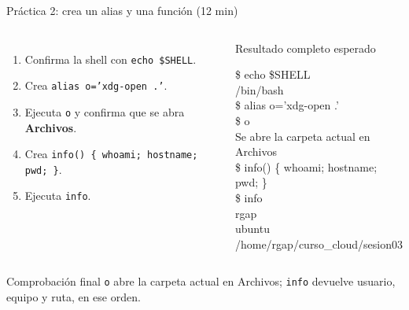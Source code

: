 \documentclass[aspectratio=169,10pt,c]{beamer}
\begin{document}
\begin{frame}{Práctica 2: crea un alias y una función \textnormal{\small(12 min)}}
\begin{columns}[T,onlytextwidth]
\begin{enumerate}\setlength\itemsep{4pt}\small
  \item Confirma la shell con \texttt{echo \$SHELL}.
  \item Crea \texttt{alias o='xdg-open .'}.
  \item Ejecuta \texttt{o} y confirma que se abra \textbf{Archivos}.
  \item Crea \texttt{info() \{ whoami; hostname; pwd; \}}.
  \item Ejecuta \texttt{info}.
\end{enumerate}
\begin{exampleblock}{Resultado completo esperado}
\begin{terminal}\$ echo \$SHELL\\
/bin/bash\\
\$ alias o='xdg-open .'\\
\$ o\\
Se abre la carpeta actual en Archivos\\
\$ info() \{ whoami; hostname; pwd; \}\\
\$ info\\
rgap\\
ubuntu\\
/home/rgap/curso\_cloud/sesion03
\end{terminal}
\end{exampleblock}
\end{columns}
\begin{alertblock}{Comprobación final}
\small \texttt{o} abre la carpeta actual en Archivos; \texttt{info} devuelve usuario, equipo y ruta, en ese orden.
\end{alertblock}
\end{frame}
\end{document}

